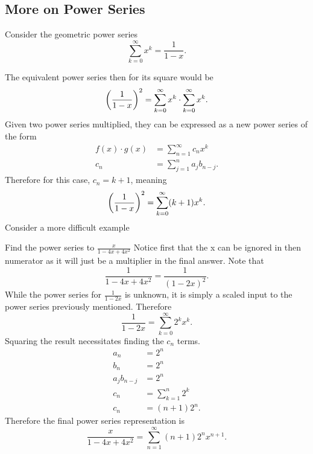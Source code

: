 \documentclass[../notes.tex]{subfiles}
\begin{document}
\subsection{More on Power Series}

Consider the geometric power series
\[
\sum_{k=0}^{\infty} x^{k} = \frac{1}{1-x}
.\]

The equivalent power series then for its square would be
\[
    \qty(\frac{1}{1-x})^2 = \sum_{k=0}^{\infty} x^{k} \cdot \sum_{k=0}^{\infty} x^{k}
.\]
Given two power series multiplied, they can be expressed as a new power series of the form
\begin{align*}
    f(x) \cdot g(x) &= \sum_{n=1}^{\infty} c_n x^{k} \\
    c_n &= \sum_{j=1}^{n} a_j b_{n-j}
.\end{align*}
Therefore for this case, $c_n = k+1$, meaning
\[
    \qty(\frac{1}{1-x})^2 = \sum_{k=0}^{\infty} (k+1)x^{k}
.\]
Consider a more difficult example
\begin{example}{Find the power series to $\frac{x}{1-4x+4x^2}$}
    Notice first that the x can be ignored in then numerator as it will just be a multiplier in the final answer. Note that
    \[
        \frac{1}{1-4x+4x^2} = \frac{1}{(1-2x)^2}
    .\]
While the power series for $\frac{1}{1-2x}$ is unknown, it is simply a scaled input to the power series previously mentioned. Therefore
\[
    \frac{1}{1-2x} = \sum_{k=0}^{\infty} 2^{k}x^{k}
.\]
Squaring the result necessitates finding the $c_n$ terms.
\begin{align*}
    a_n &= 2^{n} \\
    b_n &= 2^{n} \\
    a_j b_{n-j} &= 2^{n} \\
    c_n & =\sum_{k=1}^{n} 2^{k} \\
    c_n &= (n+1)2^{n}
.\end{align*}
Therefore the final power series representation is
\[
    \frac{x}{1-4x+4x^2} = \sum_{n=1}^{\infty} (n+1)2^{n}x^{n+1}
.\]
\end{example}
\end{document}
